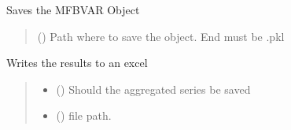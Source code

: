 \documentclass[letterpaper,10pt,english]{sphinxmanual}
\begin{document}
\begin{fulllineitems}
\begin{fulllineitems}
\end{fulllineitems}


\begin{fulllineitems}
\label{\detokenize{MUFBVAR:MUFBVAR.mufbvar.multifrequency_var.save}}
\pysigstartsignatures
{}
\pysigstopsignatures
\sphinxAtStartPar
Saves the MFBVAR Object
\begin{quote}\begin{description}
\sphinxAtStartPar
{} () \textendash{} Path where to save the object. End must be .pkl

\end{description}\end{quote}

\end{fulllineitems}


\begin{fulllineitems}
\label{\detokenize{MUFBVAR:MUFBVAR.mufbvar.multifrequency_var.to_excel}}
\pysigstartsignatures
{}
\pysigstopsignatures
\sphinxAtStartPar
Writes the results to an excel
\begin{quote}\begin{description}
\begin{itemize}
\item {} 
\sphinxAtStartPar
{} () \textendash{} Should the aggregated series be saved

\item {} 
\sphinxAtStartPar
{} () \textendash{} file path.

\end{itemize}

\end{description}\end{quote}

\end{fulllineitems}


\end{fulllineitems}
\end{document}
